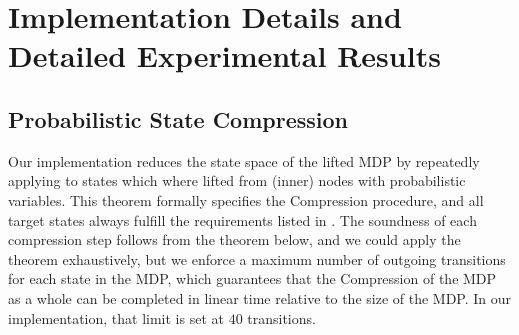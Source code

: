 \section{Implementation Details and Detailed Experimental Results}\label{app:implementation}

\subsection{Probabilistic State Compression}\label{app:compression}

Our implementation reduces the state space of the lifted MDP by repeatedly applying  to states which where lifted from (inner) nodes with probabilistic variables. 
This theorem formally specifies the Compression procedure, and all target states always fulfill the requirements listed in .
The soundness of each compression step follows from the theorem below, and we could apply the theorem exhaustively, but we enforce a maximum number of outgoing transitions for each state in the MDP, which guarantees that the Compression of the MDP as a whole can be completed in linear time relative to the size of the MDP.
In our implementation, that limit is set at $40$ transitions. 

